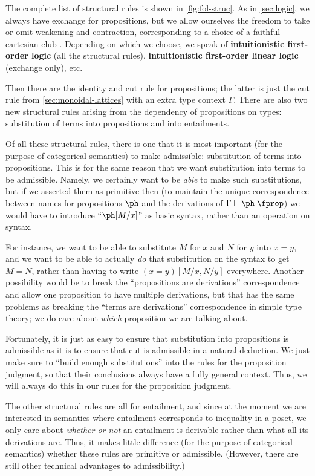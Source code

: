 The complete list of structural rules is shown in \cref{fig:fol-struc}.
As in \cref{sec:logic}, we always have exchange for propositions, but we allow ourselves the freedom to take or omit weakening and contraction, corresponding to a choice of a faithful cartesian club \fS.
Depending on which we choose, we speak of \textbf{intuitionistic first-order logic} (all the structural rules), \textbf{intuitionistic first-order linear logic} (exchange only), etc.

Then there are the identity and cut rule for propositions; the latter is just the cut rule from \cref{sec:monoidal-lattices} with an extra type context $\Gamma$.
There are also two new structural rules arising from the dependency of propositions on types: substitution of terms into propositions and into entailments.

Of all these structural rules, there is one that it is most important (for the purpose of categorical semantics) to make admissible: substitution of terms into propositions.
This is for the same reason that we want substitution into terms to be admissible.
Namely, we certainly want to be \emph{able} to make such substitutions, but if we asserted them as primitive then (to maintain the unique correspondence between names for propositions $\ph$ and the derivations of $\Gamma\types \ph\prop$) we would have to introduce ``$\ph[M/x]$'' as basic syntax, rather than an operation on syntax.

For instance, we want to be able to substitute $M$ for $x$ and $N$ for $y$ into $x=y$, and we want to be able to actually \emph{do} that substitution on the syntax to get $M=N$, rather than having to write $(x=y)[M/x,N/y]$ everywhere.
Another possibility would be to break the ``propositions are derivations'' correspondence and allow one proposition to have multiple derivations, but that has the same problems as breaking the ``terms are derivations'' correspondence in simple type theory; we do care about \emph{which} proposition we are talking about.

Fortunately, it is just as easy to ensure that substitution into propositions is admissible as it is to ensure that cut is admissible in a natural deduction.
We just make sure to ``build enough substitutions'' into the rules for the proposition judgment, so that their conclusions always have a fully general context.
Thus, we will always do this in our rules for the proposition judgment.

The other structural rules are all for entailment, and since at the moment we are interested in semantics where entailment corresponds to inequality in a poset, we only care about \emph{whether or not} an entailment is derivable rather than what all its derivations are.
Thus, it makes little difference (for the purpose of categorical semantics) whether these rules are primitive or admissible.
(However, there are still other technical advantages to admissibility.)

